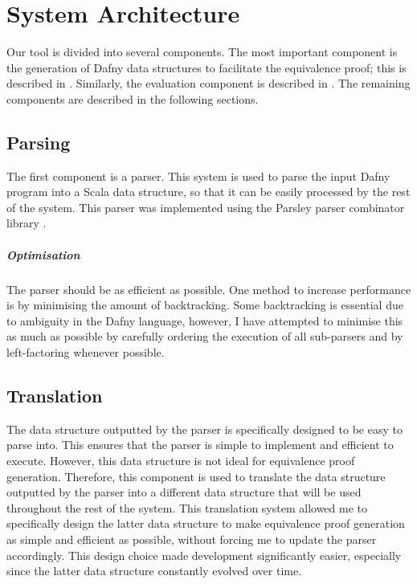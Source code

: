 \chapter{System Architecture}


Our tool is divided into several components. The most important component is the generation of Dafny data structures to facilitate the equivalence proof; this is described in . Similarly, the evaluation component is described in . The remaining components are described in the following sections. 

\section{Parsing}


The first component is a parser. This system is used to parse the input Dafny program into a Scala data structure, so that it can be easily processed by the rest of the system. This parser was implemented using the Parsley parser combinator library \parencite{willisJmie6Parsley2026}. 

\paragraph{Optimisation} The parser should be as efficient as possible. One method to increase performance is by minimising the amount of backtracking. Some backtracking is essential due to ambiguity in the Dafny language, however, I have attempted to minimise this as much as possible by carefully ordering the execution of all sub-parsers and by left-factoring whenever possible.

\section{Translation}

The data structure outputted by the parser is specifically designed to be easy to parse into. This ensures that the parser is simple to implement and efficient to execute. However, this data structure is not ideal for equivalence proof generation. Therefore, this component is used to translate the data structure outputted by the parser into a different data structure that will be used throughout the rest of the system. This translation system allowed me to specifically design the latter data structure to make equivalence proof generation as simple and efficient as possible, without forcing me to update the parser accordingly. This design choice made development significantly easier, especially since the latter data structure constantly evolved over time.


